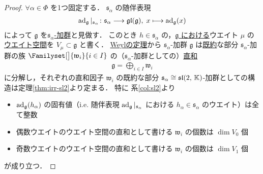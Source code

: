 \documentclass[rep_main]{subfiles}
\begin{document}
\begin{proof}
	$\forall \alpha \in \Phi$ を1つ固定する．
	$\mathfrak{s}_\alpha$ の随伴表現
	\begin{align}
		\operatorname{ad}_{\mathfrak{g}}|_{\mathfrak{s}_\alpha} \colon \mathfrak{s}_\alpha \longrightarrow \mathfrak{gl} (\mathfrak{g}),\; x \longmapsto \operatorname{ad}_{\mathfrak{g}}(x)
	\end{align}
	によって $\mathfrak{g}$ を\hyperref[ax:g-module]{$\mathfrak{s}_\alpha$-加群}と見做す．
	このとき $h \in \mathfrak{s}_\alpha$ の，\underline{$\mathfrak{g}$ における}ウエイト $\mu$ の\hyperref[def:weight-space]{ウエイト空間}を $V_\mu \subset \mathfrak{g}$ と書く．
	\hyperref[thm:Weyl]{Weylの定理}から $\mathfrak{s}_\alpha$-加群 $\mathfrak{g}$ は\hyperref[def:irr]{既約}な部分 $\mathfrak{s}_\alpha$-加群の族 $\Familyset[\big]{\mathfrak{w}_i}{i \in I}$ の（$\mathfrak{s}_\alpha$-加群としての）\hyperref[def:gmod-directsum]{直和}
	\begin{align}
		\label{eq:prop2.5.4-Weyl}
		\mathfrak{g} = \bigoplus_{i \in I} \mathfrak{w}_i
	\end{align}
	に分解し，それぞれの直和因子 $\mathfrak{w}_i$ の既約な部分 $\mathfrak{s}_\alpha \cong \mathfrak{sl}(2,\, \mathbb{K})$-加群としての構造は定理\ref{thm:irr-sl2}より定まる．
	特に
	系\ref{col:sl2}より 
	\begin{itemize}
		\item $\operatorname{ad}_{\mathfrak{g}}(h_\alpha)$ の固有値（i.e. 随伴表現 $\operatorname{ad}_{\mathfrak{g}}|_{\mathfrak{s}_\alpha}$ における $h_\alpha \in \mathfrak{s}_\alpha$ のウエイト）は全て整数
		\item 偶数ウエイトのウエイト空間の直和として書ける $\mathfrak{w}_i$ の個数は $\dim V_0$ 個
		\item 奇数ウエイトのウエイト空間の直和として書ける $\mathfrak{w}_i$ の個数は $\dim V_1$ 個
	\end{itemize}
	が成り立つ．


\end{proof}
\end{document}

